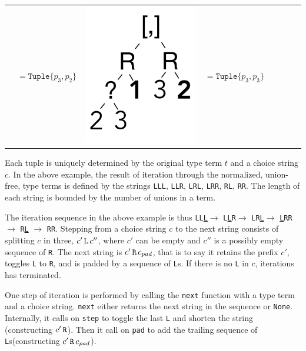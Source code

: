 \documentclass[a4paper,english]{lipics-v2019}
\newcommand{\xt}[1]{\texttt{#1}}
\renewcommand{\L}{{\tt L}\xspace}
\newcommand{\Ls}{{\tt L}s\xspace}
\newcommand{\R}{{\tt R}\xspace}
\newcommand{\uL}{{\underline{\tt L}}\xspace}
\renewcommand{\c}[1]{\lstinline{#1}\xspace}
\newcommand{\tuple}[1]{\xt{Tuple\{}#1\xt{\}}}
\begin{document}
{\begin{tabular}{@{}l@{~}ll@{~}ll@{~}ll@{~}l}
\begin{minipage}{1.2cm}
\end{minipage} &  $ =   \tuple{p_3,p_2} $ 
&\begin{minipage}{1.2cm}\includegraphics[scale=.25]{figures/tree7.pdf} 
\end{minipage} &  $ =   \tuple{p_3,p_3} $ 
\end{tabular}}

\newpage

\noindent 
Each tuple is uniquely determined by the original type term $t$ and a choice
string $c$. In the above example, the result of iteration through the
normalized, union-free, type terms is defined by the strings \L\L\L, \L\L\R,
\L\R\L, \L\R\R, \R\L, \R\R. The length of each string is bounded by the
number of unions in a term.


The iteration sequence in the above example is thus \L\L\uL $\rightarrow$
\L\uL\R $\rightarrow$ \L\R\uL $\rightarrow$ \uL\R\R $\rightarrow$ \R\uL
$\rightarrow$ \R\R. Stepping from a choice string $c$ to the next string
consists of splitting $c$ in three, $c' \,\L\,c''$, where $c'$ can be empty
and $c''$ is a possibly empty sequence of \R.  The next string is $c'\, \R
\, c_{pad}$, that is to say it retains the prefix $c'$, toggles \L to \R,
and is padded by a sequence of \Ls.  If there is no \L in $c$, iterations has
terminated.

One step of iteration is performed by calling the \c{next} function with a
type term and a choice string. \c{next} either returns the next string in
the sequence or \c{None}. Internally, it calls on \c{step} to toggle the
last \L and shorten the string (constructing $c'\,\R$). Then it call on
\c{pad} to add the trailing sequence of \Ls (constructing $c'\,\R\,c_{pad}$).
\end{document}
